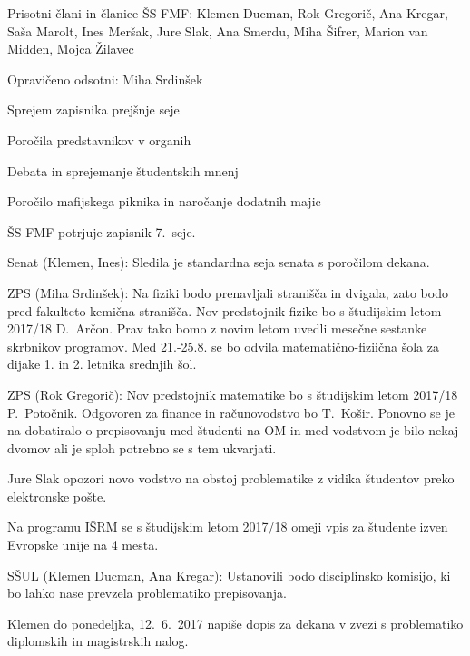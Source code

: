 \documentclass{seja}
\begin{document}
Prisotni člani in članice ŠS FMF: Klemen Ducman, Rok Gregorič, Ana Kregar, Saša Marolt, Ines Meršak, Jure Slak, Ana Smerdu, Miha Šifrer, Marion van Midden, Mojca Žilavec

Opravičeno odsotni: Miha Srdinšek

\begin{red*}
\item Sprejem zapisnika prejšnje seje
\item Poročila predstavnikov v organih
\item Debata in sprejemanje študentskih mnenj
\item Poročilo mafijskega piknika in naročanje dodatnih majic
\end{red*}

\begin{ad}
\item
\begin{sklep*}
  ŠS FMF potrjuje zapisnik 7.~seje.
\end{sklep*}

\item
Senat (Klemen, Ines): Sledila je standardna seja senata s poročilom dekana.

ZPS (Miha Srdinšek): Na fiziki bodo prenavljali stranišča in dvigala, zato bodo pred fakulteto kemična stranišča. Nov predstojnik fizike bo s študijskim letom 2017/18 D.\ Arčon. Prav tako bomo z novim letom uvedli mesečne sestanke skrbnikov programov. Med 21.-25.8. se bo odvila matematično-fiziična šola za dijake 1. in 2. letnika srednjih šol.

ZPS (Rok Gregorič): Nov predstojnik matematike bo s študijskim letom 2017/18 P.\ Potočnik. Odgovoren za finance in računovodstvo bo T.\ Košir. Ponovno se je na dobatiralo o prepisovanju med študenti na OM in med vodstvom je bilo
nekaj dvomov ali je sploh potrebno se s tem ukvarjati.
\begin{sklep*}
Jure Slak opozori novo vodstvo na obstoj problematike z vidika študentov preko elektronske pošte.
\end{sklep*}
Na programu IŠRM se s študijskim letom 2017/18 omeji vpis za študente izven Evropske unije na 4 mesta.

SŠUL (Klemen Ducman, Ana Kregar): Ustanovili bodo disciplinsko komisijo, ki bo lahko nase prevzela
problematiko prepisovanja.

\item
Klemen do ponedeljka, 12.\ 6.\ 2017 napiše dopis za dekana v zvezi s problematiko diplomskih in magistrskih nalog.


\end{ad}
\end{document}
